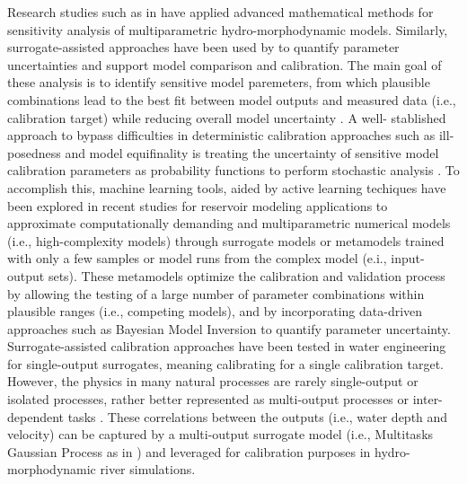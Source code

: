 \documentclass[draft,linenumbers,onecolumn]{agujournal2019} %
\begin{document}
Research studies such as in \cite{villaret2016firstorder,beckers2018uncertainty,clare2022calibration} have applied advanced mathematical methods for sensitivity analysis of multiparametric hydro-morphodynamic models. Similarly, surrogate-assisted approaches have been used by  \cite{mohammadi2018bayesian,beckers2020bayesian} to quantify parameter uncertainties and support model comparison and calibration. The main goal of these analysis is to identify sensitive model paremeters, from which plausible combinations lead to the best fit between model outputs and measured data (i.e., calibration target) while reducing overall model uncertainty \cite{oberkampf2004verification}. A well- stablished approach to bypass difficulties in deterministic calibration approaches such as ill-posedness and model equifinality is treating the uncertainty of sensitive model calibration parameters as probability functions to perform stochastic analysis \cite{kim2016stepwise}. To accomplish this, machine learning tools, aided by active learning techiques have been explored in recent studies for reservoir modeling applications \cite{schwindt2023bayesian, mouris2023stability} to approximate computationally demanding and multiparametric numerical models (i.e., high-complexity models) through surrogate models or metamodels trained with only a few samples or model runs from the complex model (e.i., input-output sets). These metamodels optimize the calibration and validation process by allowing the testing of a large number of parameter combinations within plausible ranges (i.e., competing models), and by incorporating data-driven approaches such as Bayesian Model Inversion \cite{mohammadi2018bayesian} to quantify parameter uncertainty. Surrogate-assisted calibration approaches have been tested in water engineering for single-output surrogates, meaning calibrating for a single calibration target. However, the physics in many natural processes are rarely single-output or isolated processes, rather better represented as multi-output processes \cite{ferreira2022multioutput} or inter-dependent tasks \cite{bonilla2007multitask}. These correlations between the outputs (i.e., water depth and velocity) can be captured by a multi-output surrogate model (i.e., Multitasks Gaussian Process as in \cite{bonilla2007multitask}) and leveraged for calibration purposes in hydro-morphodynamic river simulations. 
\end{document}
